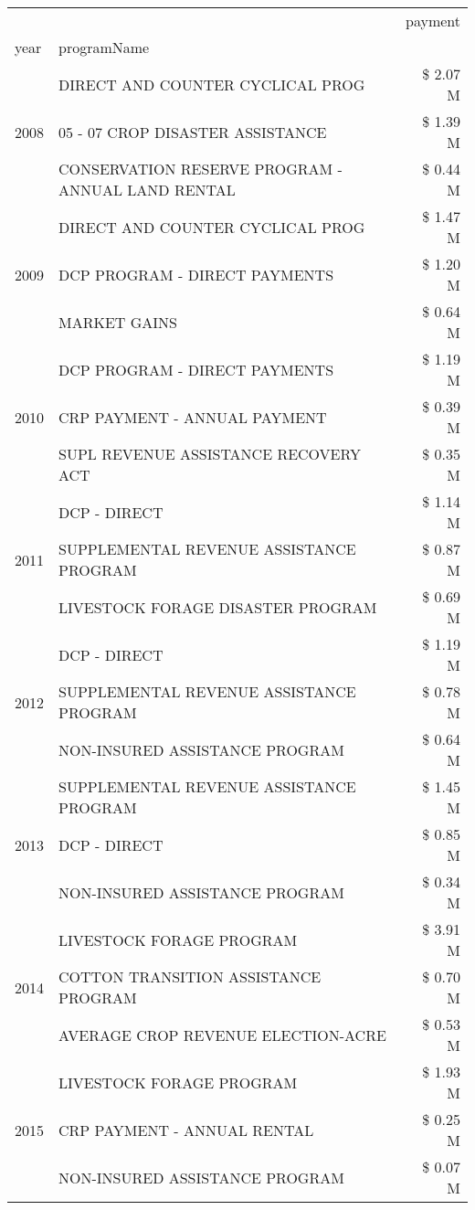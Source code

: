 \begin{tabular}{llr}
\toprule
 &  & payment \\
year & programName &  \\
\midrule
\multirow[t]{3}{*}{2008} & DIRECT AND COUNTER CYCLICAL PROG & \$ 2.07 M \\
 & 05 - 07 CROP DISASTER ASSISTANCE & \$ 1.39 M \\
 & CONSERVATION RESERVE PROGRAM - ANNUAL LAND RENTAL & \$ 0.44 M \\
\cline{1-3}
\multirow[t]{3}{*}{2009} & DIRECT AND COUNTER CYCLICAL PROG & \$ 1.47 M \\
 & DCP PROGRAM - DIRECT PAYMENTS & \$ 1.20 M \\
 & MARKET GAINS & \$ 0.64 M \\
\cline{1-3}
\multirow[t]{3}{*}{2010} & DCP PROGRAM - DIRECT PAYMENTS & \$ 1.19 M \\
 & CRP PAYMENT - ANNUAL PAYMENT & \$ 0.39 M \\
 & SUPL REVENUE ASSISTANCE RECOVERY ACT & \$ 0.35 M \\
\cline{1-3}
\multirow[t]{3}{*}{2011} & DCP - DIRECT & \$ 1.14 M \\
 & SUPPLEMENTAL REVENUE ASSISTANCE PROGRAM & \$ 0.87 M \\
 & LIVESTOCK FORAGE DISASTER PROGRAM & \$ 0.69 M \\
\cline{1-3}
\multirow[t]{3}{*}{2012} & DCP - DIRECT & \$ 1.19 M \\
 & SUPPLEMENTAL REVENUE ASSISTANCE PROGRAM & \$ 0.78 M \\
 & NON-INSURED ASSISTANCE PROGRAM & \$ 0.64 M \\
\cline{1-3}
\multirow[t]{3}{*}{2013} & SUPPLEMENTAL REVENUE ASSISTANCE PROGRAM & \$ 1.45 M \\
 & DCP - DIRECT & \$ 0.85 M \\
 & NON-INSURED ASSISTANCE PROGRAM & \$ 0.34 M \\
\cline{1-3}
\multirow[t]{3}{*}{2014} & LIVESTOCK FORAGE PROGRAM & \$ 3.91 M \\
 & COTTON TRANSITION ASSISTANCE PROGRAM & \$ 0.70 M \\
 & AVERAGE CROP REVENUE ELECTION-ACRE & \$ 0.53 M \\
\cline{1-3}
\multirow[t]{3}{*}{2015} & LIVESTOCK FORAGE PROGRAM & \$ 1.93 M \\
 & CRP PAYMENT - ANNUAL RENTAL & \$ 0.25 M \\
 & NON-INSURED ASSISTANCE PROGRAM & \$ 0.07 M \\
\cline{1-3}

\end{tabular}
